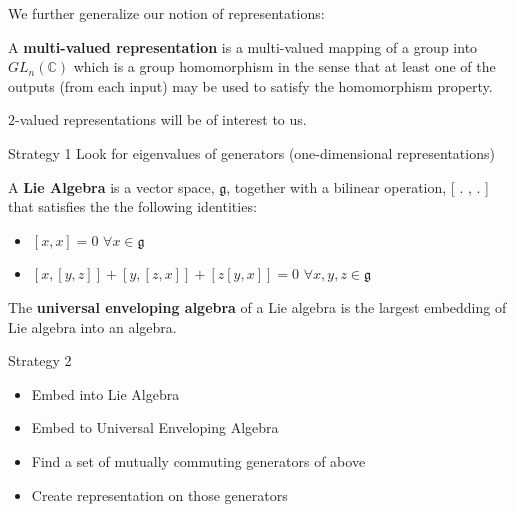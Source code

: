 \documentclass[compress,aspectratio=169,10pt,usenames,dvipsnames]{beamer}
\newcommand{\C}{\mathbb{C}}
\begin{document}
\begin{frame}
\vfill
We further generalize our notion of representations:
\vfill
\begin{definition}
	A \textbf{multi-valued representation} is a multi-valued mapping of a group into $GL_n(\C)$ which is a group homomorphism in the sense that at least one of the outputs (from each input) may be used to satisfy the homomorphism property.
\end{definition}
\vfill
$2$-valued representations will be of interest to us.
\vfill
\end{frame}

%
%

\begin{frame}
	\begin{block}{Strategy 1}
		Look for eigenvalues of generators (one-dimensional representations)
	\end{block}
\end{frame}
\begin{frame}
\begin{definition}
	A \textbf{Lie Algebra} is a vector space, $\mathfrak{g}$, together with a bilinear operation, [ . , . ] that satisfies the the following identities:
\begin{itemize}
	\item$ [x,x] = 0$  $\forall x\in\mathfrak{g}$
	\item $[x,[y,z]] + [y,[z,x]] + [z[y,x]]= 0 $ $\forall x,y,z\in\mathfrak{g}$
\end{itemize}
\end{definition}
	\begin{definition}
		The \textbf{universal enveloping algebra} of a Lie algebra is the largest embedding of Lie algebra into an algebra. 
	\end{definition}
	\begin{block}{Strategy 2}
	\begin{itemize}
	\item Embed into Lie Algebra
	\item Embed to Universal Enveloping Algebra
	\item Find a set of mutually commuting generators of above
	\item Create representation on those generators
	\end{itemize}
\end{block}
\end{frame}
\end{document}
